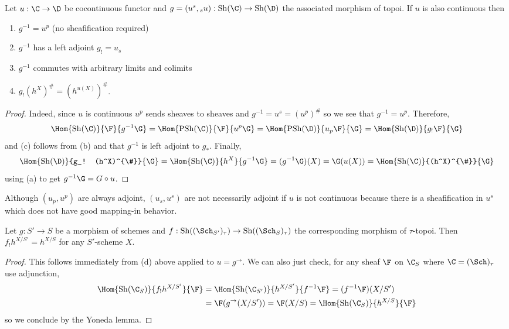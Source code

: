 \documentclass[12pt]{article}
\begin{document}
\begin{lemma}
Let $u : \C \to \D$ be cocontinuous functor and $g = (u^s, {}_s u) : \Sh(\C) \to \Sh(\D)$ the associated morphism of topoi. If $u$ is also continuous then
\begin{enumerate}
\item $g^{-1} = u^p$ (no sheafification required)
\item $g^{-1}$ has a left adjoint $g_! = u_s$
\item $g^{-1}$ commutes with arbitrary limits and colimits
\item $g_! (h^{X})^{\#} = (h^{u(X)})^{\#}$.
\end{enumerate}
\end{lemma}

\begin{proof}
Indeed, since $u$ is continuous $u^p$ sends sheaves to sheaves and $g^{-1} = u^s = (u^p)^{\#}$ so we see that $g^{-1} = u^p$. Therefore, 
\begin{align*}
\Hom{\Sh(\C)}{\F}{g^{-1} \G} = \Hom{\PSh(\C)}{\F}{u^p \G} = \Hom{\PSh(\D)}{u_p \F}{\G} = \Hom{\Sh(\D)}{g_! \F}{\G} 
\end{align*}
and (c) follows from (b) and that $g^{-1}$ is left adjoint to $g_*$. Finally,
\[ \Hom{\Sh(\D)}{g_! (h^X)^{\#}}{\G} = \Hom{\Sh(\C)}{h^X}{g^{-1} \G} = (g^{-1} \G)(X) = \G(u(X)) = \Hom{\Sh(\C)}{(h^X)^{\#}}{\G} \]
using (a) to get $g^{-1} \G = G \circ u$.
\end{proof}

\begin{rmk}
Although $(u_p, u^p)$ are always adjoint, $(u_s, u^s)$ are not necessarily adjoint if $u$ is not continuous because there is a sheafification in $u^s$ which does not have good mapping-in behavior.
\end{rmk}


\begin{cor}
Let $g : S' \to S$ be a morphism of schemes and $f : \Sh((\Sch_{S'})_{\tau}) \to \Sh((\Sch_{S})_{\tau})$
the corresponding morphism of $\tau$-topoi. Then $f_! h^{X/S'} = h^{X/S}$ for any $S'$-scheme $X$.
\end{cor}

\begin{proof}
This follows immediately from (d) above applied to $u = g^{\to}$. We can also just check,
for any sheaf $\F$ on $\C_{S}$ where $\C = (\Sch)_{\tau}$ use adjunction,
\begin{align*}
\Hom{\Sh(\C_{S})}{f_! h^{X/S'}}{\F} & = \Hom{\Sh(\C_{S'})}{h^{X/S'}}{f^{-1} \F} = (f^{-1} \F)(X/S')
\\
& = \F(g^{\to}(X/S')) = \F(X/S) = \Hom{\Sh(\C_{S})}{h^{X/S}}{\F}
\end{align*}
so we conclude by the Yoneda lemma.
\end{proof}
\end{document}
